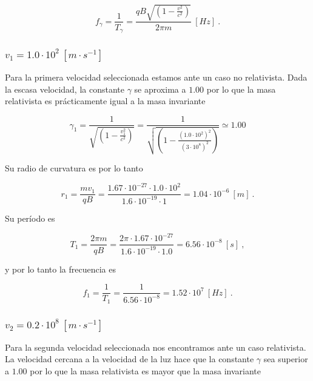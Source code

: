 \documentclass[journal]{IEEEtran}
\begin{document}
\begin{equation}
    f_\gamma = \displaystyle\frac{1}{T_\gamma} = \displaystyle\frac{qB\sqrt{(1-\displaystyle\frac{v^2}{c^2})}}{2\pi m}~[Hz]~.
\end{equation}

\subsubsection{$v_1 = 1.0\cdot 10^2~[m\cdot s^{-1}]$}

Para la primera velocidad seleccionada estamos ante un caso no relativista. Dada la escasa velocidad, la constante $\gamma$ se aproxima a $1.00$ por lo que la masa relativista es prácticamente igual a la masa invariante

\begin{equation}
\gamma_1 = \displaystyle\frac{1}{\sqrt{(1-\displaystyle\frac{v_1^2}{c^2})}} = \displaystyle\frac{1}{\sqrt{(1-\displaystyle\frac{(1.0\cdot 10^2)^2}{(3\cdot 10^8)^2})}} \simeq 1.00
\end{equation}

Su radio de curvatura es por lo tanto

\begin{equation}
r_1 = \displaystyle\frac{mv_1}{qB} = \displaystyle\frac{1.67\cdot 10^{-27}\cdot 1.0\cdot 10^2}{1.6\cdot 10^{-19}\cdot 1} = 1.04\cdot 10^{-6}~[m]~.
\end{equation}

Su período es

\begin{equation}
T_1 = \displaystyle\frac{2\pi m}{qB} = \displaystyle\frac{2\pi \cdot 1.67\cdot 10^{-27}}{1.6\cdot 10^{-19}\cdot 1.0} = 6.56\cdot 10^{-8}~[s]~,
\end{equation}

y por lo tanto la frecuencia es

\begin{equation}
f_1 = \displaystyle\frac{1}{T_1} = \displaystyle\frac{1}{6.56\cdot 10^{-8}} = 1.52\cdot 10^7~[Hz]~.
\end{equation}

\subsubsection{$v_2 = 0.2\cdot 10^8~[m\cdot s^{-1}]$}

Para la segunda velocidad seleccionada nos encontramos ante un caso relativista. La velocidad cercana a la velocidad de la luz hace que la constante $\gamma$ sea superior a $1.00$ por lo que la masa relativista es mayor que la masa invariante 
\end{document}
